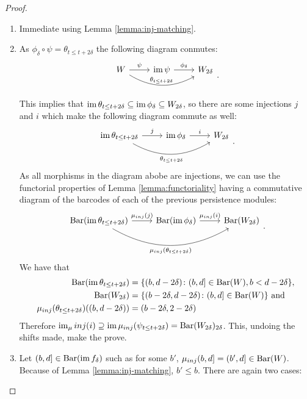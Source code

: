 \begin{proof}
\begin{enumerate}
    \item Immediate using Lemma \ref{lemma:inj-matching}.
    \item As $ \phi_\delta \circ \psi = \theta_{t \leq t+2\delta} $ the following diagram conmutes:
    $$
    \begin{tikzcd}
        W \arrow[r, "\psi"] \arrow[rr, "\theta_{t \leq t+2\delta}", bend right] 
        & \im \psi \arrow[r, "\phi_\delta"] 
        & W_{2\delta} \\
    \end{tikzcd}.
    $$
    This implies that $ \operatorname{im} \theta_{t \leq t+2\delta} \subseteq \operatorname{im} \phi_\delta \subseteq W_{2\delta} $, so there are some injections $ j $ and $ i $ which make the following diagram commute as well:
    $$
    \begin{tikzcd}
        \im \theta_{t \leq t+2\delta} \arrow[r, "j"] \arrow[rr, "\theta_{t \leq t+2\delta}"', bend right] 
        & \im \phi_\delta \arrow[r, "i"] 
        & W_{2\delta} \\
    \end{tikzcd}.
    $$
    As all morphisms in the diagram abobe are injections, we can use the functorial properties of Lemma \ref{lemma:functoriality} having a commutative diagram of the barcodes of each of the previous persistence modules:
    $$
    \begin{tikzcd}
        \barc(\im \theta_{t \leq t+2\delta}) \arrow[r, "\mu_{inj}(j)"] \arrow[rr, "\mu_{inj}(\theta_{t \leq t+2\delta})"', bend right] 
        & \barc(\im \phi_\delta) \arrow[r, "\mu_{inj}(i)"] 
        & \barc(W_{2\delta}) \\
    \end{tikzcd}.
    $$
    We have that
    \begin{align}
        \operatorname{Bar}(\operatorname{im} \theta_{t \leq t+2\delta}) &= \{ (b, d-2 \delta) \colon (b, d] \in \operatorname{Bar}(W), b < d - 2 \delta\}, \\
        \operatorname{Bar}(W_{2 \delta}) &= \{ (b - 2 \delta, d - 2\delta) \colon (b, d] \in \operatorname{Bar}(W) \} \text{ and } \\
        \mu_{inj}(\theta_{t \leq t+2\delta})((b, d-2 \delta)) &= (b - 2 \delta, 2 - 2\delta)
    \end{align}
    Therefore $ \operatorname{im}_\mu{inj}(i) \supseteq \operatorname{im} \mu_{inj}(\psi_{t \leq t+2\delta}) = \operatorname{Bar}(W_{2 \delta})_{2 \delta}$. This, undoing the shifts made, make the prove.

    \item Let $ (b, d] \in \operatorname{Bar}(\operatorname{im} f_\delta) $ such as for some $ b' $, $ \mu_{inj}(b, d] = (b', d] \in \operatorname{Bar}(W) $. Because of Lemma \ref{lemma:inj-matching}, $ b' \leq b $. There are again two cases:
    

\end{enumerate}
\end{proof}
